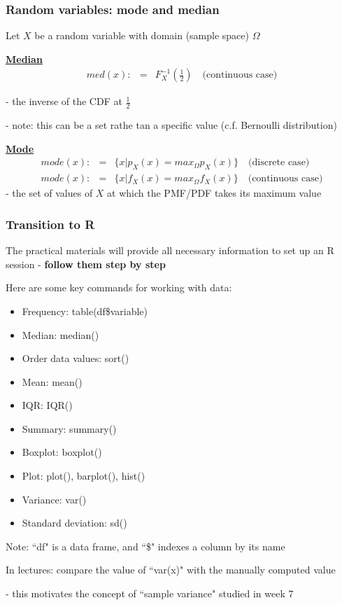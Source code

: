 \documentclass[t,8pt]{beamer}%
\begin{document}
	\begin{frame}
		\frametitle{Random variables: mode and median}
		Let $X$ be a random variable with domain (sample space) $\Omega$ \par
		{\bf\underline{Median}}
		\begin{eqnarray*}
			med(x):&=&F_X^{-1}\left(\frac 12\right)\quad\text{(continuous case)}
		\end{eqnarray*}
		{\small\color{NavyBlue} - the inverse of the CDF at $\frac 12$ \par
			- note: this can be a set rathe tan a specific value (c.f. Bernoulli distribution)} \par
		{\bf\underline{Mode}}
		\begin{eqnarray*}
			mode(x):&=&\lbrace x\vert p_X(x)=max_{\Omega}p_X(x)\rbrace\quad\text{(discrete case)}\\
			mode(x):&=&\lbrace x\vert f_X(x)=max_{\Omega}f_X(x)\rbrace\quad\text{(continuous case)}
		\end{eqnarray*}
		{\small\color{NavyBlue} - the set of values of $X$ at which the PMF/PDF takes its maximum value}
	\end{frame}

    \begin{frame}
		\frametitle{Transition to R}
        The practical materials will provide all necessary information to set up an R session - {\bf follow them step by step} \par
        Here are some key commands for working with data:
        {\footnotesize
		\begin{itemize}
            \item Frequency: table(df\$variable)
            \item Median: median()
            \item Order data values: sort()
            \item Mean: mean()
            \item IQR: IQR()
            \item Summary: summary()
            \item Boxplot: boxplot()
            \item Plot: plot(), barplot(), hist()
            \item Variance: var()
            \item Standard deviation: sd()
        \end{itemize}
        }
        Note: ``df" is a data frame, and ``\$" indexes a column by its name \par
        In lectures: compare the value of ``var(x)" with the manually computed value \par
        {\small\color{NavyBlue} - this motivates the concept of ``sample variance" studied in week 7}
        
	\end{frame}
	
\end{document}
